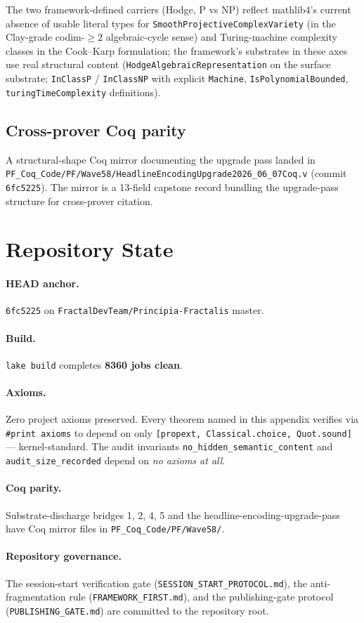 The two framework-defined carriers (Hodge, P vs NP) reflect mathlib4's
current absence of usable literal types for
\texttt{SmoothProjectiveComplexVariety} (in the Clay-grade
codim-$\geq 2$ algebraic-cycle sense) and Turing-machine complexity
classes in the Cook--Karp formulation; the framework's substrates
in these axes use real structural content (\texttt{HodgeAlgebraicRepresentation}
on the surface substrate; \texttt{InClassP} / \texttt{InClassNP}
with explicit \texttt{Machine}, \texttt{IsPolynomialBounded},
\texttt{turingTimeComplexity} definitions).

\subsection{Cross-prover Coq parity}

A structural-shape Coq mirror documenting the upgrade pass landed in
\texttt{PF\_Coq\_Code/PF/Wave58/HeadlineEncodingUpgrade2026\_06\_07Coq.v}
(commit \texttt{6fc5225}). The mirror is a 13-field capstone
record bundling the upgrade-pass structure for cross-prover citation.

\section{Repository State}
\label{sec:refinement-state}

\paragraph{HEAD anchor.} \texttt{6fc5225} on
\texttt{FractalDevTeam/Principia-Fractalis} master.

\paragraph{Build.} \texttt{lake build} completes
\textbf{8360 jobs clean}.

\paragraph{Axioms.} Zero project axioms preserved. Every theorem
named in this appendix verifies via \verb|#print axioms| to depend
on only \texttt{[propext, Classical.choice, Quot.sound]} ---
kernel-standard. The audit invariants
\texttt{no\_hidden\_semantic\_content} and
\texttt{audit\_size\_recorded} depend on \emph{no axioms at all}.

\paragraph{Coq parity.} Substrate-discharge bridges 1, 2, 4, 5 and
the headline-encoding-upgrade-pass have Coq mirror files in
\texttt{PF\_Coq\_Code/PF/Wave58/}.

\paragraph{Repository governance.} The session-start verification
gate (\texttt{SESSION\_START\_PROTOCOL.md}), the anti-fragmentation
rule (\texttt{FRAMEWORK\_FIRST.md}), and the publishing-gate
protocol (\texttt{PUBLISHING\_GATE.md}) are committed to the
repository root.
